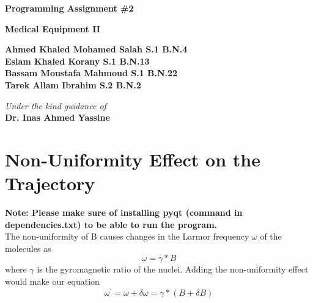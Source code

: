 \documentclass[18pt]{extarticle}
\begin{document}
\begin{center}
	\begin{LARGE}			\bf{Programming Assignment \#2\\}
	\end{LARGE}
	\vspace*{30pt}
	
	
	\vspace{20pt}
	\textbf{Medical Equipment II\\}
	\vspace{40pt}
	
	\textbf{
		Ahmed Khaled Mohamed Salah \hspace*{10mm} S.1  B.N.4\\
		Eslam Khaled Korany \hspace*{26mm} S.1  B.N.13\\
		Bassam Moustafa Mahmoud \hspace*{15mm} S.1  B.N.22\\
		Tarek Allam Ibrahim \hspace*{26mm} S.2  B.N.2\\
	}
		\vspace{30pt}

	\vspace{30pt}
	\textit{Under the kind guidance of}\\
	\textbf{Dr. Inas Ahmed Yassine
	}\\
	
	
	\vspace{20pt}
	
	
	

\end{center}
\pagebreak



\section{Non-Uniformity Effect on the Trajectory}
\textbf{Note: Please make sure of installing pyqt (command in dependencies.txt) to be able to run the program.}
\\The non-uniformity of B causes changes in the Larmor frequency $\omega$ of the molecules as
\begin{equation*}
\omega = \gamma * B
\end{equation*}
where $\gamma$ is the gyromagnetic ratio of the nuclei.
Adding the non-uniformity effect would make our equation
\begin{equation*}
\omega ^{'} = \omega + \delta \omega = \gamma * (B + \delta B)
\end{equation*}
\end{document}
